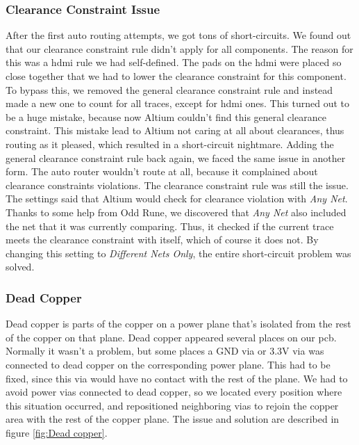 \subsubsection{Clearance Constraint Issue}
After the first auto routing attempts, we got tons of short-circuits. We found out that our clearance constraint rule didn't apply for all components. The reason for this was a \gls{hdmi} rule we had self-defined. The pads on the \gls{hdmi} were placed so close together that we had to lower the clearance constraint for this component. To bypass this, we removed the general clearance constraint rule and instead made a new one to count for all traces, except for \gls{hdmi} ones. This turned out to be a huge mistake, because now Altium couldn't find this general clearance constraint. This mistake lead to Altium not caring at all about clearances, thus routing as it pleased, which resulted in a short-circuit nightmare.
\newline
\newline
Adding the general clearance constraint rule back again, we faced the same issue in another form. The auto router wouldn't route at all, because it complained about clearance constraints violations.
\newline
The clearance constraint rule was still the issue. The settings said that Altium would check for clearance violation with \emph{Any Net}. Thanks to some help from Odd Rune, we discovered that \emph{Any Net} also included the net that it was currently comparing. Thus, it checked if the current trace meets the clearance constraint with itself, which of course it does not. By changing this setting to \emph{Different Nets Only}, the entire short-circuit problem was solved. 

\subsubsection{Dead Copper}
Dead copper is parts of the copper on a power plane that's isolated from the rest of the copper on that plane. 
Dead copper appeared several places on our \gls{pcb}. Normally it wasn't a problem, but some places a GND via or 3.3V via was connected to dead copper on the corresponding power plane. This had to be fixed, since this via would have no contact with the rest of the plane.
\newline
We had to avoid power vias connected to dead copper, so we located every position where this situation occurred, and repositioned neighboring vias to rejoin the copper area with the rest of the copper plane. The issue and solution are described in figure \ref{fig:Dead copper}.

